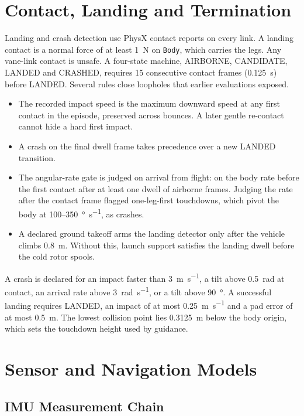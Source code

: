\documentclass[journal]{IEEEtran}
\begin{document}
\section{Contact, Landing and Termination}
\label{sec:contact}

Landing and crash detection use PhysX contact reports on every link.
A landing contact is a normal force of at least \SI{1}{\newton} on \texttt{Body}, which carries the legs.
Any vane-link contact is unsafe.
A four-state machine, AIRBORNE, CANDIDATE, LANDED and CRASHED, requires 15 consecutive contact frames (\SI{0.125}{\second}) before LANDED.
Several rules close loopholes that earlier evaluations exposed.
\begin{itemize}
\item The recorded impact speed is the maximum downward speed at any first contact in the episode, preserved across bounces.
A later gentle re-contact cannot hide a hard first impact.
\item A crash on the final dwell frame takes precedence over a new LANDED transition.
\item The angular-rate gate is judged on arrival from flight: on the body rate before the first contact after at least one dwell of airborne frames.
Judging the rate after the contact frame flagged one-leg-first touchdowns, which pivot the body at 100--\SI{350}{\degree\per\second}, as crashes.
\item A declared ground takeoff arms the landing detector only after the vehicle climbs \SI{0.8}{\metre}.
Without this, launch support satisfies the landing dwell before the cold rotor spools.
\end{itemize}
A crash is declared for an impact faster than \SI{3}{\metre\per\second}, a tilt above \SI{0.5}{\radian} at contact, an arrival rate above \SI{3}{\radian\per\second}, or a tilt above \SI{90}{\degree}.
A successful landing requires LANDED, an impact of at most \SI{0.25}{\metre\per\second} and a pad error of at most \SI{0.5}{\metre}.
The lowest collision point lies \SI{0.3125}{\metre} below the body origin, which sets the touchdown height used by guidance.

\section{Sensor and Navigation Models}
\label{sec:sensors}

\subsection{IMU Measurement Chain}
\label{sec:imu}
\end{document}

